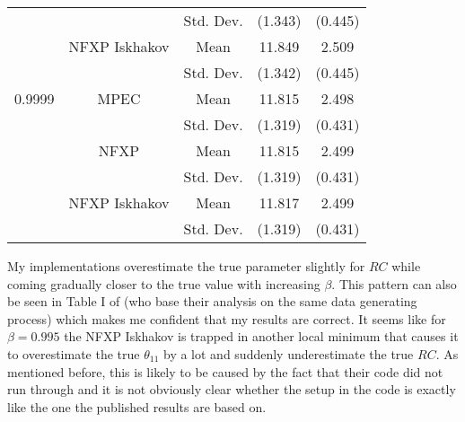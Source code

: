 \begin{table}[H]
\begin{tabular}{l c c c c}
		& & Std. Dev. & (1.343) & (0.445) \\
		& NFXP Iskhakov & Mean & 11.849 & 2.509 \\
		& & Std. Dev. & (1.342) & (0.445) \\ \midrule
		0.9999 & MPEC & Mean & 11.815 & 2.498 \\
		& & Std. Dev. & (1.319) & (0.431) \\
		& NFXP & Mean & 11.815 & 2.499 \\
		& & Std. Dev. & (1.319) & (0.431) \\
		& NFXP Iskhakov & Mean & 11.817	& 2.499 \\
		& & Std. Dev. & (1.319) & (0.431) \\ \bottomrule			
	\end{tabular}
\end{table}

My implementations overestimate the true parameter slightly for $RC$ while coming gradually closer to the true value with increasing $\beta$. This pattern can also be seen in Table I of \cite{Su.Judd.2012} (who base their analysis on the same data generating process) which makes me confident that my results are correct. It seems like for $\beta = 0.995$ the NFXP Iskhakov is trapped in another local minimum that causes it to overestimate the true $\theta_{11}$ by a lot and suddenly underestimate the true $RC$. As mentioned before, this is likely to be caused by the fact that their code did not run through and it is not obviously clear whether the setup in the code is exactly like the one the published results are based on.